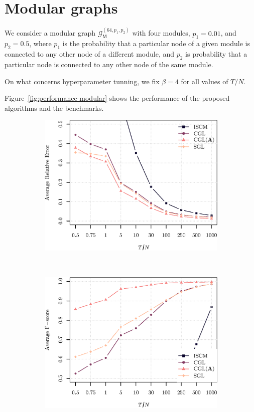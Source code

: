 \section{Modular graphs}
We consider a modular graph $\mathcal{G}^{(64, p_1, p_2)}_{\mathsf{M}}$ with four modules, $p_1 = 0.01$, and $p_2 = 0.5$,
where $p_1$ is the probability that a particular node of a given module is connected to any other node of a different module,
and $p_2$ is probability that a particular node is connected to any other node of the same module.

On what concerns hyperparameter tunning, we fix $\beta = 4$ for all values of $T/N$.

Figure~\ref{fig:performance-modular} shows the performance of the proposed algorithms and
the benchmarks.

\begin{figure}[!htb]
    \centering
    \begin{subfigure}[b]{0.47\textwidth}
        \includegraphics[width=\textwidth]{modular/relative_error_modular.eps}
    \end{subfigure}
    ~ %
    \begin{subfigure}[b]{0.47\textwidth}
        \includegraphics[width=\textwidth]{modular/fscore_modular.eps}

\end{subfigure}
\end{figure}
